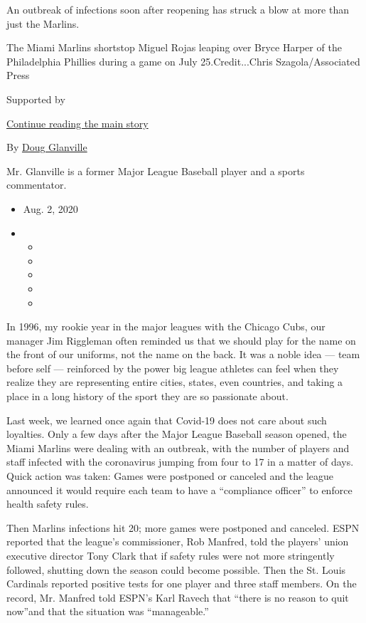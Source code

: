 An outbreak of infections soon after reopening has struck a blow at more
than just the Marlins.

The Miami Marlins shortstop Miguel Rojas leaping over Bryce Harper of
the Philadelphia Phillies during a game on July 25.Credit...Chris
Szagola/Associated Press

Supported by

\protect\hyperlink{after-sponsor}{Continue reading the main story}

By \href{https://www.nytimes.com/by/doug-glanville}{Doug Glanville}

Mr. Glanville is a former Major League Baseball player and a sports
commentator.

\begin{itemize}
\item
  Aug. 2, 2020
\item
  \begin{itemize}
  \item
  \item
  \item
  \item
  \item
  \end{itemize}
\end{itemize}

In 1996, my rookie year in the major leagues with the Chicago Cubs, our
manager Jim Riggleman often reminded us that we should play for the name
on the front of our uniforms, not the name on the back. It was a noble
idea --- team before self --- reinforced by the power big league
athletes can feel when they realize they are representing entire cities,
states, even countries, and taking a place in a long history of the
sport they are so passionate about.

Last week, we learned once again that Covid-19 does not care about such
loyalties. Only a few days after the Major League Baseball season
opened, the Miami Marlins were dealing with an outbreak, with the number
of players and staff infected with the coronavirus jumping from four to
17 in a matter of days. Quick action was taken: Games were postponed or
canceled and the league announced it would require each team to have a
``compliance officer'' to enforce health safety rules.

Then Marlins infections hit 20; more games were postponed and canceled.
ESPN reported that the league's commissioner, Rob Manfred, told the
players' union executive director Tony Clark that if safety rules were
not more stringently followed, shutting down the season could become
possible. Then the St. Louis Cardinals reported positive tests for one
player and three staff members. On the record, Mr. Manfred told ESPN's
Karl Ravech that ``there is no reason to quit now''and that the
situation was ``manageable.''

